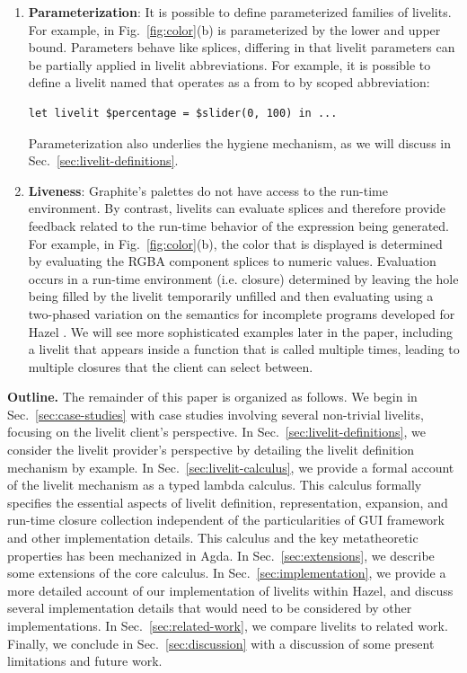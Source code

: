 \begin{enumerate}
  \item \textbf{Parameterization}: It is possible to define parameterized families of livelits. 
  For example,  in Fig.~\ref{fig:color}(b) is parameterized by the lower and upper bound. 
  Parameters behave like splices, differing in that livelit parameters can be partially applied in 
  livelit abbreviations. For example, it is possible to define a livelit named  
  that operates as a  from  to  by scoped abbreviation:
  \begin{lstlisting}[numbers=none]
  let livelit $percentage = $slider(0, 100) in ...
  \end{lstlisting}
  Parameterization also underlies the hygiene mechanism, as we will discuss in Sec.~\ref{sec:livelit-definitions}.

  \item \textbf{Liveness}: Graphite's palettes do not have 
  access to the run-time environment. By contrast, livelits can evaluate splices
  and therefore provide feedback related to the run-time behavior of the expression being generated. 
  For example, in Fig.~\ref{fig:color}(b), the color that is displayed is determined by evaluating the RGBA 
  component splices to numeric values.
  Evaluation occurs in a run-time environment (i.e. closure) determined by 
  leaving the hole being filled by the livelit temporarily unfilled and then evaluating
  using a two-phased variation on the semantics for incomplete programs developed for Hazel \cite{HazelnutLive}. 
  We will see more sophisticated examples later in the paper, including a livelit 
  that appears inside a function that is called multiple times, leading to multiple closures that the client can 
   select between.
\end{enumerate}

\noindent
\textbf{Outline.} The remainder of this paper is organized as follows. We begin in Sec.~\ref{sec:case-studies} with case studies 
involving several non-trivial livelits, focusing on the livelit client's perspective. 
In Sec.~\ref{sec:livelit-definitions}, we consider the livelit provider's perspective by detailing the livelit
definition mechanism by example. 
In Sec.~\ref{sec:livelit-calculus}, we provide a formal account of the livelit mechanism as a typed lambda calculus. 
This calculus formally specifies the essential aspects of livelit definition, representation, expansion, 
and run-time closure collection independent of the particularities of GUI framework and other implementation details. 
This calculus and the key metatheoretic properties has been mechanized in Agda.
In Sec.~\ref{sec:extensions}, we describe some extensions of the core calculus.
In Sec.~\ref{sec:implementation}, we provide a more detailed account of our implementation of livelits within Hazel, 
and discuss several implementation details that would need to be considered by other implementations.  
In Sec.~\ref{sec:related-work}, we compare livelits to related work. 
Finally, we conclude in Sec.~\ref{sec:discussion} with a discussion of some present limitations and future work.